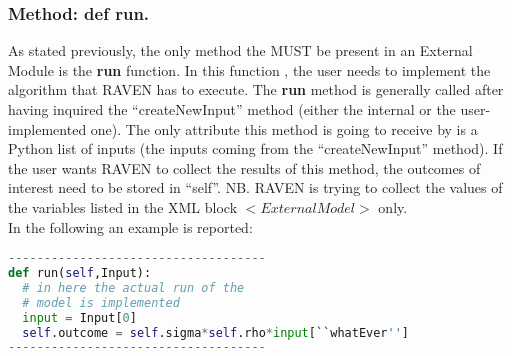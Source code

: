 \subsubsection{Method: def run.}
\label{subsubsec:externalRun}
As stated previously, the only method the MUST be present in an External Module is the \textbf{run} function. In this function , the user needs to implement the algorithm that RAVEN has to execute. The  \textbf{run} method is generally called after having inquired the ``createNewInput'' method (either the internal  or the user-implemented one). The only attribute this method is going to receive by is a Python list of inputs (the inputs coming from the ``createNewInput'' method).
If the user wants RAVEN to collect the results of this method, the outcomes of interest need to be stored in ``self''. NB. RAVEN is trying to collect the values of the variables listed in the XML  block $<ExternalModel>$ only.
\\In the following an example is reported:

\begin{lstlisting}[language=python]
------------------------------------
def run(self,Input):
  # in here the actual run of the 
  # model is implemented
  input = Input[0]
  self.outcome = self.sigma*self.rho*input[``whatEver'']
------------------------------------
\end{lstlisting} 

%


